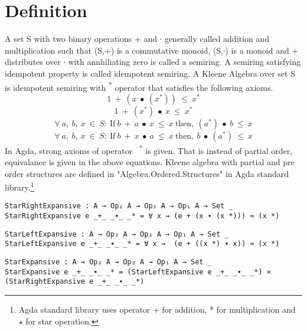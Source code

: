 \section{Definition}
A set S with two binary operations + and ∙ generally called addition and
multiplication such that (S,+) is a commutative monoid, (S,∙) is a monoid and +
distributes over ∙ with annhiliating zero is called a semiring. A semiring
satisfying idempotent property is called idempotent semiring. A Kleene Algebra
over set S is idempotent semiring with \textsuperscript{*} operator that satisfies the
following axioms.
\begin{equation}\label{eq_starrightexpansive}
1\ +\ (x\ ∙\ (x^{*}))\ \leq\ x^{*}
\end{equation}
\begin{equation}\label{eq_starleftexpansive}
1\ +\ (x^{*})\ ∙\ x\ \leq\ x^{*}
\end{equation}
\begin{equation}\label{eq_starleftdestructive}
\forall\ a,\ b,\ x\ \in\ S:\ \text{If} \ b\ +\ a\  ∙\ x\ \leq\ x\ \text{then},\ (a^{*})\ ∙\ b\ \leq\ x
\end{equation}
\begin{equation}\label{eq_starrightdestructive}
\forall\ a,\ b,\ x\ \in\ S:\ \text{If} \ b\ +\ x\ ∙\ a\ \leq\ x \  \text{then},\ b\ ∙\ (a^{*})\ \leq\ x
\end{equation}
In Agda, strong axioms of operator \ \textsuperscript{*} is given. That is instead of
partial order, equivalance is given in the above equations. Kleene algebra with
partial and pre order structures are defined in "Algebra.Ordered.Structures" in
Agda standard library.\footnote{Agda standard library uses operator + for
addition, * for multiplication and $\star$ for star operation.} 
\begin{verbatim}
StarRightExpansive : A → Op₂ A → Op₂ A → Op₁ A → Set _
StarRightExpansive e _+_ _∙_ _* = ∀ x → (e + (x ∙ (x *))) ≈ (x *)
\end{verbatim}
\begin{verbatim}
StarLeftExpansive : A → Op₂ A → Op₂ A → Op₁ A → Set _
StarLeftExpansive e _+_ _∙_ _* = ∀ x →  (e + ((x *) ∙ x)) ≈ (x *)
\end{verbatim}
\begin{verbatim}
StarExpansive : A → Op₂ A → Op₂ A → Op₁ A → Set _
StarExpansive e _+_ _∙_ _* = (StarLeftExpansive e _+_ _∙_ _*) × (StarRightExpansive e _+_ _∙_ _*)
\end{verbatim}
